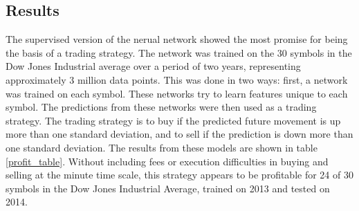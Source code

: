 \documentclass{article}
\begin{document}
\subsection{Results}
The supervised version of the nerual network showed the most promise for
being the basis of a trading strategy. The network was trained on
the $30$ symbols in the Dow Jones Industrial average over a period of
two years, representing approximately $3$ million data points. This
was done in two ways: first, a network was trained on each symbol. These
networks try to learn features unique to each symbol. 
The predictions from these networks were then used as a trading strategy. The trading
strategy is to buy if the predicted future movement is up more than one standard
deviation, and to sell if the prediction is down more than one standard deviation.
The results from these models are shown in table \ref{profit_table}. Without
including fees or execution difficulties in buying and selling at the minute
time scale, this strategy appears to be profitable for 24 of 30 symbols in the
Dow Jones Industrial Average, trained on 2013 and tested on 2014.
\end{document}
